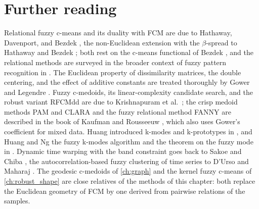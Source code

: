 \section{Further reading}\label{sec:rel:reading}
\enlargethispage{2\baselineskip}%

Relational fuzzy c-means and its duality with FCM are due to Hathaway, Davenport, and Bezdek \cite{hathaway:1989:rfcm}, the non-Euclidean extension with the $\beta$-spread to Hathaway and Bezdek \cite{hathaway:1994:nerf}; both rest on the c-means functional of Bezdek \cite{bezdek:1981}, and the relational methods are surveyed in the broader context of fuzzy pattern recognition in \cite{bezdek:1999:models}. The Euclidean property of dissimilarity matrices, the double centering, and the effect of additive constants are treated thoroughly by Gower and Legendre \cite{gower:1986:euclidean}. Fuzzy c-medoids, its linear-complexity candidate search, and the robust variant RFCMdd are due to Krishnapuram et al.\ \cite{krishnapuram:2001:fcmdd}; the crisp medoid methods PAM and CLARA and the fuzzy relational method FANNY are described in the book of Kaufman and Rousseeuw \cite{kaufman:1990:groups}, which also uses Gower's coefficient \cite{gower:1971:coefficient} for mixed data. Huang introduced k-modes and k-prototypes in \cite{huang:1998:kprototypes}, and Huang and Ng the fuzzy k-modes algorithm and the theorem on the fuzzy mode in \cite{huang:1999:fuzzykmodes}. Dynamic time warping with the band constraint goes back to Sakoe and Chiba \cite{sakoe:1978:dtw}, the autocorrelation-based fuzzy clustering of time series to D'Urso and Maharaj \cite{durso:2009:autocorrelation}. The geodesic c-medoids of \cref{ch:graph} and the kernel fuzzy c-means of \cref{ch:robust_shape} are close relatives of the methods of this chapter: both replace the Euclidean geometry of FCM by one derived from pairwise relations of the samples.

